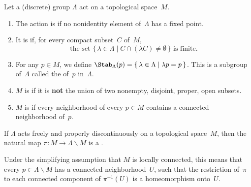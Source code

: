 

\begin{defns}
 Let a (discrete) group $\Lambda$ act on a topological space~$M$. 
 \begin{enumerate}
 \item The action is  if no
nonidentity element of~$\Lambda$ has a fixed point.
 \item It is  if, for every
compact subset~$C$ of~$M$,
 $$ \text{the set $\{\, \lambda \in \Lambda \mid C \cap (\lambda C) \neq \emptyset
\,\}$ is finite} .$$
 \item For any $p \in M$, we define 
	$\Stab_\Lambda(p)
 = \{\, \lambda \in \Lambda \mid \lambda p = p \,\}$. This is a
subgroup of~$\Lambda$ called the  of~$p$ in~$\Lambda$.

\item $M$ is  if it is \textbf{not} the union of two nonempty, disjoint, proper, open subsets.
\item $M$ is  if every neighborhood of every $p \in M$ contains a connected neighborhood of~$p$.
 \end{enumerate}
 \end{defns}

\begin{prop} \label{PropdiscFree->cover}
 If $\Lambda$ acts freely and properly discontinuously on a
topological space~$M$, then the natural map $\pi \colon M \to \Lambda
\backslash M$ is a {\normalfont{}}.

Under the simplifying assumption that $M$ is locally connected, this means that every $p \in \Lambda \backslash M$ has a connected neighborhood~$U$, such that the restriction of~$\pi$ to each connected component of $\pi^{-1}(U)$ is a homeomorphism onto~$U$.
 \end{prop}

%



